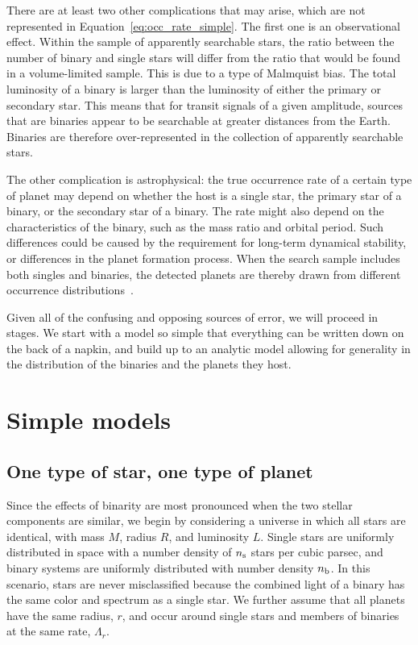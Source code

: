 \documentclass[12pt,modern]{aastex61}
\newcommand{\s}{_{\rm s}}
\renewcommand{\b}{_{\rm b}}
\begin{document}
There are at least two other complications that may arise, which are
not represented in Equation~\ref{eq:occ_rate_simple}.  The first one
is an observational effect. Within the sample of apparently searchable
stars, the ratio between the number of binary and single stars will
differ from the ratio that would be found in a volume-limited sample.
This is due to a type of Malmquist bias.  The total luminosity of a
binary is larger than the luminosity of either the primary or
secondary star.  This means that for transit signals of a given
amplitude, sources that are binaries appear to be searchable at
greater distances from the Earth.  Binaries are therefore
over-represented in the collection of apparently searchable stars.

The other complication is astrophysical: the true occurrence rate of a
certain type of planet may depend on whether the host is a single
star, the primary star of a binary, or the secondary star of a binary.
The rate might also depend on the characteristics of the binary, such
as the mass ratio and orbital period.  Such differences could be
caused by the requirement for long-term dynamical stability, or
differences in the planet formation process.  When the search sample
includes both singles and binaries, the detected planets are thereby
drawn from different occurrence distributions~\citep[see][]{
  wang_occurrence_2015,kraus_impact_2016}.

Given all of the confusing and opposing sources of error, we will
proceed in stages.  We start with a model so simple that everything
can be written down on the back of a napkin, and build up to an
analytic model allowing for generality in the distribution of the
binaries and the planets they host.  



\section{Simple models}
\label{sec:simplest}

\subsection{One type of star, one type of planet}
\label{sec:model_1}

Since the effects of binarity are most pronounced when the two stellar
components are similar, we begin by considering a universe in which
all stars are identical, with mass $M$, radius $R$, and luminosity
$L$.  Single stars are uniformly distributed in space with a number
density of $n\s$ stars per cubic parsec, and binary systems are
uniformly distributed with number density $n\b$.  In this scenario,
stars are never misclassified because the combined light of a binary
has the same color and spectrum as a single star.  We further assume
that all planets have the same radius, $r$, and occur around single
stars and members of binaries at the same rate, $\Lambda_r$.
\end{document}
